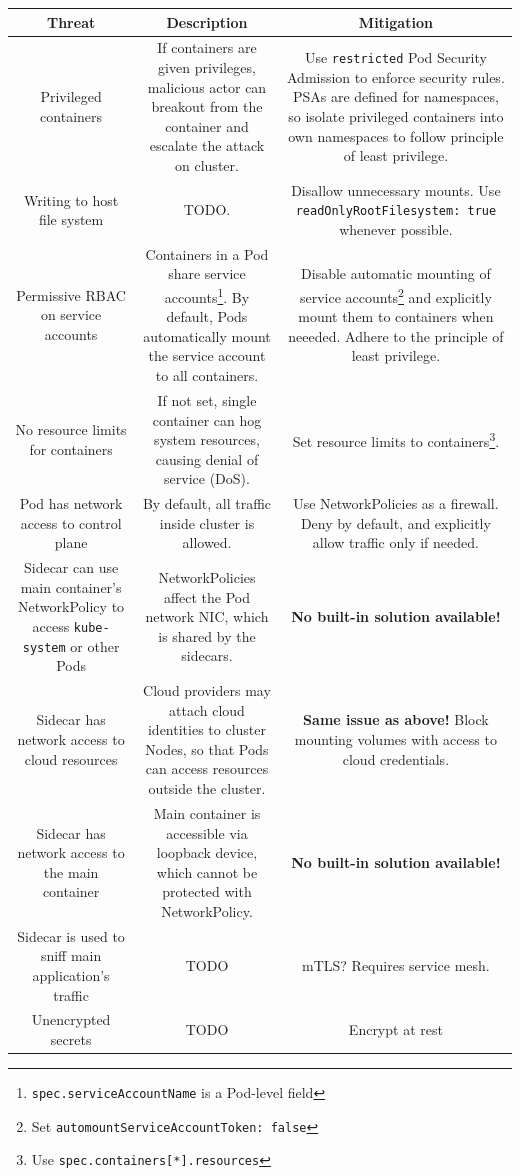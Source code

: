\documentclass[english, 12pt, a4paper, sci, utf8, a-2b, online]{aaltothesis}
\begin{document}
\begin{table}[H]
  \begin{minipage}{\textwidth}
  \renewcommand{\thempfootnote}{\arabic{mpfootnote}}
  \begin{tabularx}{\textwidth}{CCC}
    \hline
    \textbf{Threat} & \textbf{Description} & \textbf{Mitigation}\\ \hline
    Privileged containers & If containers are given privileges, malicious actor can breakout from the container and escalate the attack on cluster. & Use \texttt{restricted} Pod Security Admission to enforce security rules. PSAs are defined for namespaces, so isolate privileged containers into own namespaces to follow principle of least privilege. \\ \hline
    Writing to host file system & TODO. & Disallow unnecessary mounts. Use \texttt{readOnlyRootFilesystem: true} whenever possible. \\ \hline
    Permissive RBAC on service accounts & Containers in a Pod share service accounts\footnote{\texttt{spec.serviceAccountName} is a Pod-level field}. By default, Pods automatically mount the service account to all containers. & Disable automatic mounting of service accounts\footnote{Set \texttt{automountServiceAccountToken: false}} and explicitly mount them to containers when neeeded. Adhere to the principle of least privilege. \\ \hline
    No resource limits for containers & If not set, single container can hog system resources, causing denial of service (DoS). & Set resource limits to containers\footnote{Use \texttt{spec.containers[*].resources}}. \\ \hline
    Pod has network access to control plane & By default, all traffic inside cluster is allowed. & Use NetworkPolicies as a firewall. Deny by default, and explicitly allow traffic only if needed. \\ \hline
    Sidecar can use main container's NetworkPolicy to access \texttt{kube-system} or other Pods & NetworkPolicies affect the Pod network NIC, which is shared by the sidecars. & \textbf{No built-in solution available!} \\ \hline
    Sidecar has network access to cloud resources & Cloud providers may attach cloud identities to cluster Nodes, so that Pods can access resources outside the cluster. & \textbf{Same issue as above!} Block mounting volumes with access to cloud credentials. \\ \hline
    Sidecar has network access to the main container & Main container is accessible via loopback device, which cannot be protected with NetworkPolicy. & \textbf{No built-in solution available!} \\ \hline
    Sidecar is used to sniff main application's traffic & TODO & mTLS? Requires service mesh. \\ \hline
    Unencrypted secrets & TODO & Encrypt at rest \\ \hline
  \end{tabularx}
\end{minipage}
\end{table}
\end{document}
